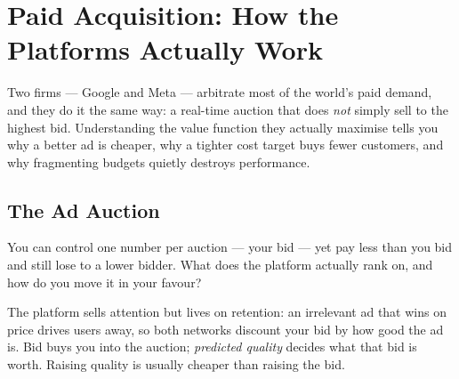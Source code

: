 \chapter{Paid Acquisition: How the Platforms Actually Work}\label{ch:paid-acquisition-platforms}


Two firms --- Google and Meta --- arbitrate most of the world's paid demand, and they do it the same way: a real-time auction that does \emph{not} simply sell to the highest bid. Understanding the value function they actually maximise tells you why a better ad is cheaper, why a tighter cost target buys fewer customers, and why fragmenting budgets quietly destroys performance.

\section{The Ad Auction}\label{sec:ad-auction}

\begin{decision}
You can control one number per auction --- your bid --- yet pay less than you bid and still lose to a lower bidder. What does the platform actually rank on, and how do you move it in your favour?
\end{decision}

\begin{intuition}
The platform sells attention but lives on retention: an irrelevant ad that wins on price drives users away, so both networks discount your bid by how good the ad is. Bid buys you into the auction; \emph{predicted quality} decides what that bid is worth. Raising quality is usually cheaper than raising the bid.
\end{intuition}

